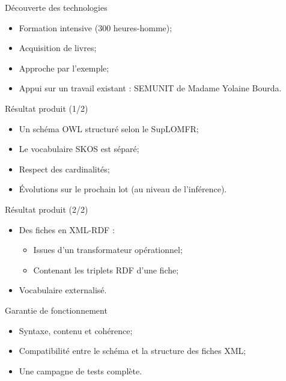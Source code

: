 \begin{frame}{Découverte des technologies}

\begin{itemize}
 \item Formation intensive (300 heures-homme);
 \item Acquisition de livres;
 \item Approche par l'exemple;
 \item Appui sur un travail existant : SEMUNIT de Madame Yolaine Bourda.
\end{itemize}

\end{frame}

\begin{frame}{Résultat produit (1/2)}

\begin{itemize}
 \item Un schéma OWL structuré selon le SupLOMFR;
 \item Le vocabulaire SKOS est séparé;
 \item Respect des cardinalités;
 \item Évolutions sur le prochain lot (au niveau de l'inférence).

\end{itemize}
\end{frame}

\begin{frame}{Résultat produit (2/2)}
\begin{itemize}
 \item Des fiches en XML-RDF :
 \begin{itemize}
    \item Issues d'un transformateur opérationnel;
    \item Contenant les triplets RDF d'une fiche;
  \end{itemize}
 \item Vocabulaire externalisé.
\end{itemize}
\end{frame}

\begin{frame}{Garantie de fonctionnement}
\begin{itemize}
 \item Syntaxe, contenu et cohérence;
 \item Compatibilité entre le schéma et la structure des fiches XML;
 \item Une campagne de tests complète.
\end{itemize}
\end{frame}



